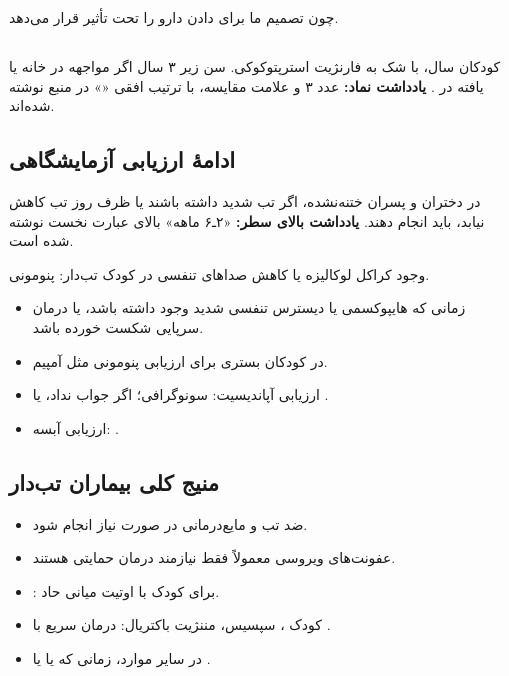 \documentclass[12pt,a4paper]{article}
\begin{document}
چون تصمیم ما برای دادن دارو را تحت تأثیر قرار می‌دهد.

\subsection*{}
کودکان \FeverOlderMath{3\leq} سال، با شک به فارنژیت استرپتوکوکی.
سن زیر ۳ سال اگر مواجهه در خانه یا یافته در .
\textbf{یادداشت نماد:} عدد ۳ و علامت مقایسه، با ترتیب افقی «\FeverOlderMath{3\leq}» در منبع نوشته شده‌اند.

\subsection*{ادامهٔ ارزیابی آزمایشگاهی}
در دختران و پسران ختنه‌نشده، اگر تب شدید داشته باشند یا ظرف \FeverOlderMath{2\leq} روز تب کاهش نیابد، باید  انجام دهند.
\textbf{یادداشت بالای سطر:} «۲ـ۶ ماهه» بالای عبارت نخست نوشته شده است.

وجود کراکل لوکالیزه یا کاهش صداهای تنفسی در کودک تب‌دار: پنومونی.
\begin{itemize}
\item {} زمانی که هایپوکسمی یا دیسترس تنفسی شدید وجود داشته باشد، یا درمان سرپایی شکست خورده باشد.
\item در کودکان بستری  برای ارزیابی  پنومونی مثل آمپیم.
\end{itemize}

\begin{itemize}
\item ارزیابی آپاندیسیت: سونوگرافی؛ اگر جواب نداد،  یا .
\item ارزیابی آبسه: .
\end{itemize}

\subsection*{منیج کلی بیماران تب‌دار}
\begin{itemize}
\item ضد تب و مایع‌درمانی در صورت نیاز انجام شود.
\item عفونت‌های ویروسی معمولاً فقط نیازمند درمان حمایتی هستند.
\item {}: برای کودک با اوتیت میانی حاد.
\item کودک ، سپسیس، مننژیت باکتریال: درمان سریع با .
\item در سایر موارد،  زمانی که  یا  یا .
\end{itemize}
\end{document}
